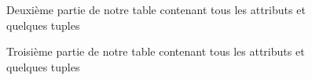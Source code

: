 \documentclass[a4paper,sffamily,12pt]{article}
\begin{document}
				\begin{figure}[!h]
					\centering						
					\caption{Deuxième partie de notre table contenant tous les attributs et quelques tuples}
					\label{table_p2}	
				\end{figure}			

				\begin{figure}[!h]
					\centering						
					\caption{Troisième partie de notre table contenant tous les attributs et quelques tuples}
					\label{table_p3}	
				\end{figure}	
\end{document}
